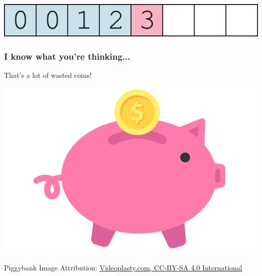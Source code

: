 \documentclass[aspectratio=169]{beamer}
\begin{document}
\begin{frame}[fragile]
    \begin{center}
      \includegraphics[width=.8\textwidth]{amortizedgfx/push_big_005.png}
    \end{center}
    
\end{frame}

\begin{frame}
  \frametitle{I know what you're thinking...}
  
  That's a lot of wasted coins!
  
\end{frame}


\begin{frame}
  \begin{center}
    \includegraphics[height=.8\textheight]{amortizedgfx/piggybank.png}
  \end{center}
  \tiny{
  Piggybank Image Attribution: \href{https://commons.wikimedia.org/wiki/File:Piggy_Bank_or_Savings_Flat_Icon_Vector.svg}{Videoplasty.com, CC-BY-SA 4.0 International}}
  
\end{frame}
\end{document}
